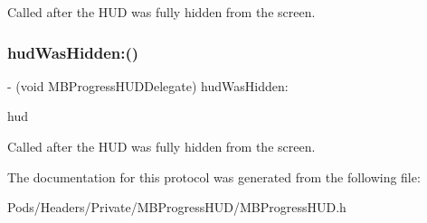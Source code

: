 Called after the H\+UD was fully hidden from the screen. \mbox{\label{protocol_m_b_progress_h_u_d_delegate_01-p_a381495ae06f579ec2ad90c23d4fdfaea}} 
\subsubsection{\texorpdfstring{hud\+Was\+Hidden\+:()}{hudWasHidden:()}\hspace{0.1cm}{\footnotesize\ttfamily [3/3]}}
{\footnotesize\ttfamily -\/ (void M\+B\+Progress\+H\+U\+D\+Delegate) hud\+Was\+Hidden\+: \begin{DoxyParamCaption}\item[{(\mbox{\hyperlink{interface_m_b_progress_h_u_d}{M\+B\+Progress\+H\+UD}} $\ast$)}]{hud }\end{DoxyParamCaption}\hspace{0.3cm}{\ttfamily [optional]}}

Called after the H\+UD was fully hidden from the screen. 

The documentation for this protocol was generated from the following file\+:\begin{DoxyCompactItemize}
\item 
Pods/\+Headers/\+Private/\+M\+B\+Progress\+H\+U\+D/M\+B\+Progress\+H\+U\+D.\+h\end{DoxyCompactItemize}
